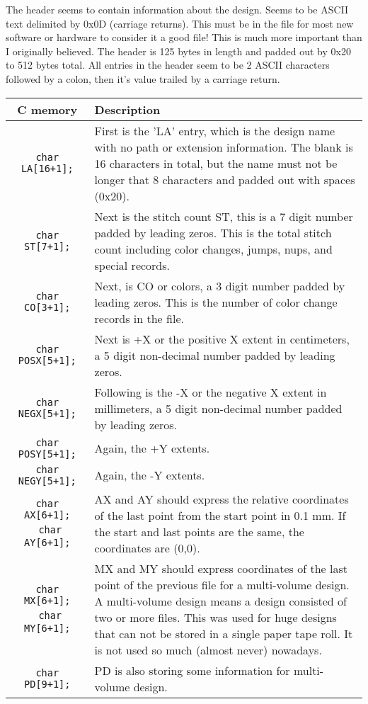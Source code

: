 \documentclass[onesize, a4paper]{refart}
\begin{document}
The header seems to contain information about the design.
Seems to be ASCII text delimited by 0x0D (carriage returns).
This must be in the file for most new software or hardware
to consider it a good file! This is much more important
than I originally believed. The header is 125 bytes in
length and padded out by 0x20 to 512 bytes total.
All entries in the header seem to be 2 ASCII characters
followed by a colon, then it's value trailed by a carriage return.

\begin{tabularx}{\linewidth}{@{}cX@{}}
\caption{The sections of the dxf header.} \\
\toprule
\textbf{C memory} & \textbf{Description} \\[6pt]
\midrule
\endhead

\texttt{char LA[16+1];} & First is the 'LA' entry, which is the design name with no
path or extension information. The blank is 16 characters
in total, but the name must not be longer that 8 characters
and padded out with spaces (0x20). \\[6pt]
\hline
\texttt{char ST[7+1];} & Next is the stitch count ST, this is a 7 digit number
padded by leading zeros. This is the total stitch count
including color changes, jumps, nups, and special records. \\[6pt]
\hline
\texttt{char CO[3+1];} & Next, is CO or colors, a 3 digit number padded by leading
zeros. This is the number of color change records in the file. \\[6pt]
\hline
\texttt{char POSX[5+1];} & Next is +X or the positive X extent in centimeters, a 5
digit non-decimal number padded by leading zeros. \\[6pt]
\hline
\texttt{char NEGX[5+1];} & Following is the -X or the negative X extent in millimeters,
a 5 digit non-decimal number padded by leading zeros. \\[6pt]
\hline
\texttt{char POSY[5+1];} & Again, the +Y extents. \\[6pt]
\texttt{char NEGY[5+1];} & Again, the -Y extents. \\[6pt]
\texttt{char AX[6+1];} \break\ \texttt{char AY[6+1];} & AX and AY should express the relative coordinates of the
last point from the start point in 0.1 mm. If the start
and last points are the same, the coordinates are (0,0). \\[6pt]
\texttt{char MX[6+1];} \break\ \texttt{char MY[6+1];} &
 MX and MY should express coordinates of the last point of
the previous file for a multi-volume design. A multi-volume design means a design
consisted of two or more files. This was used for huge designs that can not be stored in a
single paper tape roll. It is not used so much (almost never) nowadays. \\[6pt]
\texttt{char PD[9+1];} & PD is also storing some information for multi-volume design. \\[6pt]
\bottomrule
\end{tabularx}
\end{document}
